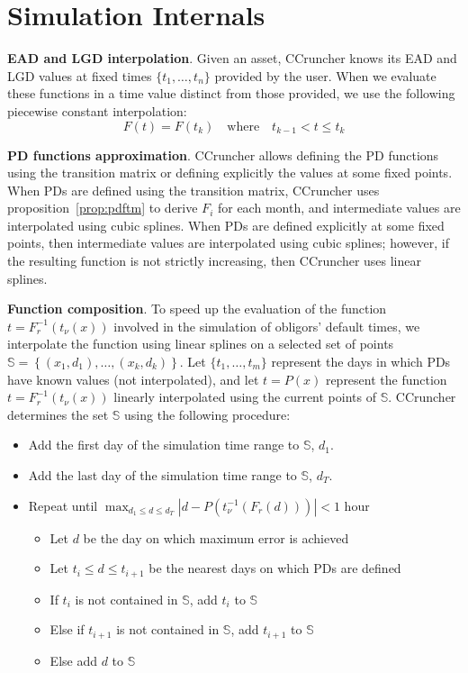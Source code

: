\documentclass[11pt,fleqn]{book} %
\begin{document}
\section{Simulation Internals}

\textbf{EAD and LGD interpolation}. Given an asset, CCruncher knows its EAD 
and LGD values at fixed times $\{t_1,\dots,t_n\}$ provided by the user. When 
we evaluate these functions in a time value distinct from those provided, we 
use the following piecewise constant interpolation:
\begin{displaymath}
	F(t) = F(t_k) \quad \text{where} \quad t_{k-1} < t \le t_{k}
\end{displaymath}

\textbf{PD functions approximation}. CCruncher allows defining the PD
functions using the transition matrix or defining explicitly the values
at some fixed points. When PDs are defined using the transition matrix, 
CCruncher uses proposition~\ref{prop:pdftm} to derive $F_i$ for each 
month, and intermediate values are interpolated using cubic splines. 
When PDs are defined explicitly at some fixed points, then intermediate 
values are interpolated using cubic splines; however, if the resulting 
function is not strictly increasing, then CCruncher uses linear splines.

\textbf{Function composition}. To speed up the evaluation of the function 
$t=F_r^{-1}(t_{\nu}(x))$ involved in the simulation of obligors' default 
times, we interpolate the function using linear splines on a selected set 
of points $\mathbb{S} = \left\{(x_1,d_1),\dots,(x_k,d_k)\right\}$. 
Let $\{t_1,\dots,t_m\}$ represent the days in which PDs have known values 
(not interpolated), and let $t=P(x)$ represent the function 
$t=F_r^{-1}(t_{\nu}(x))$ linearly interpolated using the current points 
of $\mathbb{S}$. CCruncher determines the set $\mathbb{S}$ using the 
following procedure:
\begin{itemize}
	\item Add the first day of the simulation time range to $\mathbb{S}$, $d_1$.
	\item Add the last day of the simulation time range to $\mathbb{S}$, $d_T$.
	\item Repeat until $\displaystyle \max_{d_1 \le d \le d_T}\left|d - P(t_{\nu}^{-1}(F_r(d)))\right| < 1$ hour
	\begin{itemize}
		\item Let $d$ be the day on which maximum error is achieved
		\item Let $t_i \le d \le t_{i+1}$ be the nearest days on which PDs are defined
		\item If $t_i$ is not contained in $\mathbb{S}$, add $t_i$ to $\mathbb{S}$
		\item Else if $t_{i+1}$ is not contained in $\mathbb{S}$, add $t_{i+1}$ to $\mathbb{S}$
		\item Else add $d$ to $\mathbb{S}$
	\end{itemize}
\end{itemize}
\end{document}
